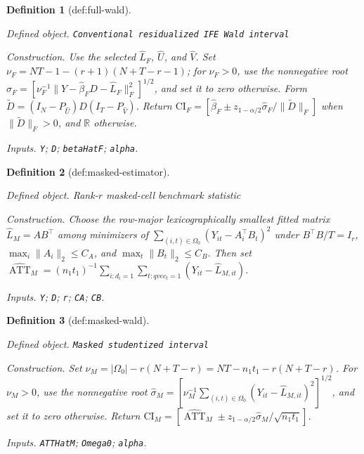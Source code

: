 \documentclass{article}
\newtheorem{definition}{Definition}
\begin{document}
\begin{definition}[def:full-wald]\label{def:full-wald}
\par\smallskip\noindent\emph{Defined object.} \texttt{Conventional residualized IFE Wald interval}
\par\smallskip\noindent\emph{Construction.} Use the selected \(\widehat L_F\), \(\widehat U\), and \(\widehat V\). Set \(\nu_F=NT-1-(r+1)(N+T-r-1)\); for \(\nu_F>0\), use the nonnegative root \(\widehat\sigma_F=[\nu_F^{-1}\|Y-\widehat\beta_FD-\widehat L_F\|_F^2]^{1/2}\), and set it to zero otherwise. Form \(\widetilde D=(I_N-P_{\widehat U})D(I_T-P_{\widehat V})\). Return \(\mathrm{CI}_F=[\widehat\beta_F\pm z_{1-\alpha/2}\widehat\sigma_F/\|\widetilde D\|_F]\) when \(\|\widetilde D\|_F>0\), and \(\mathbb R\) otherwise.
\par\smallskip\noindent\emph{Inputs.} \texttt{Y}; \texttt{D}; \texttt{betaHatF}; \texttt{alpha}.
\end{definition}

\begin{definition}[def:masked-estimator]\label{def:masked-estimator}
\par\smallskip\noindent\emph{Defined object.} Rank-\(r\) masked-cell benchmark statistic
\par\smallskip\noindent\emph{Construction.} Choose the row-major lexicographically smallest fitted matrix \(\widehat L_M=AB^{\top}\) among minimizers of \(\sum_{(i,t)\in\Omega_0}(Y_{it}-A_i^{\top}B_t)^2\) under \(B^{\top}B/T=I_r\), \(\max_i\|A_i\|_2\le C_A\), and \(\max_t\|B_t\|_2\le C_B\). Then set \(\widehat{\operatorname{ATT}}_M=(n_1t_1)^{-1}\sum_{i:d_i=1}\sum_{t:qvec_t=1}(Y_{it}-\widehat L_{M,it})\).
\par\smallskip\noindent\emph{Inputs.} \texttt{Y}; \texttt{D}; \texttt{r}; \texttt{CA}; \texttt{CB}.
\end{definition}

\begin{definition}[def:masked-wald]\label{def:masked-wald}
\par\smallskip\noindent\emph{Defined object.} \texttt{Masked studentized interval}
\par\smallskip\noindent\emph{Construction.} Set \(\nu_M=|\Omega_0|-r(N+T-r)=NT-n_1t_1-r(N+T-r)\). For \(\nu_M>0\), use the nonnegative root \(\widehat\sigma_M=[\nu_M^{-1}\sum_{(i,t)\in\Omega_0}(Y_{it}-\widehat L_{M,it})^2]^{1/2}\), and set it to zero otherwise. Return \(\mathrm{CI}_M=[\widehat{\operatorname{ATT}}_M\pm z_{1-\alpha/2}\widehat\sigma_M/\sqrt{n_1t_1}]\).
\par\smallskip\noindent\emph{Inputs.} \texttt{ATTHatM}; \texttt{Omega0}; \texttt{alpha}.
\end{definition}
\end{document}
